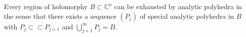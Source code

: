 Every region of holomorphy $B \subset \mathbb{C}^n$ can be exhausted by analytic polyhedra in the sense that there exists a sequence $(P_j)$ of special analytic polyhedra in $B$ with $P_j \subset \subset P_{j+1}$ and $\bigcup_{j+1}^{\infty} P_j = B$.
